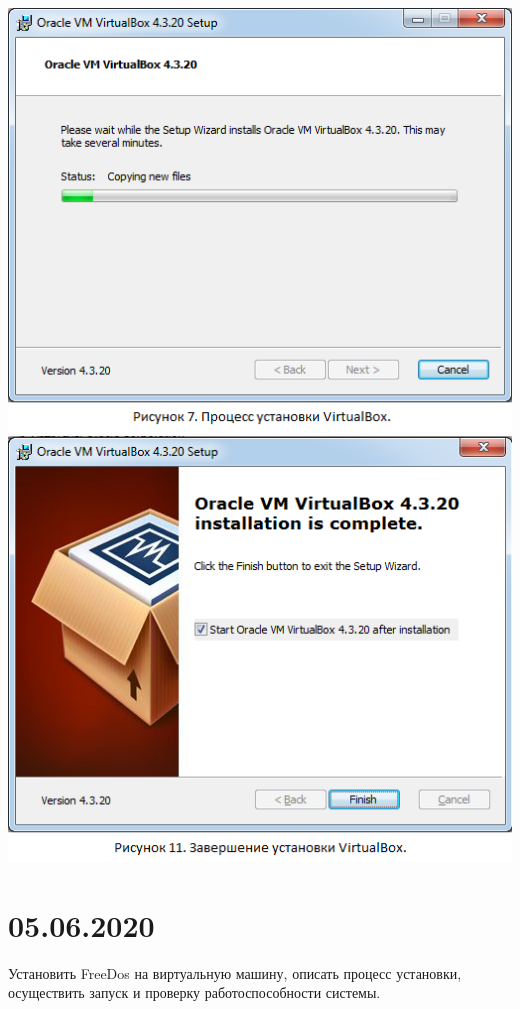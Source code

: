 \documentclass[a4paper,14pt]{extarticle}
\begin{document}
\begin{center}
  \includegraphics[scale=0.465]{img/VirtualBox3.png}
  \includegraphics[scale=0.465]{img/VirtualBox4.png}
\end{center}
\newpage
\section{05.06.2020}
Установить FreeDos на виртуальную машину, описать процесс установки, осуществить запуск и проверку работоспособности системы.
\end{document}
